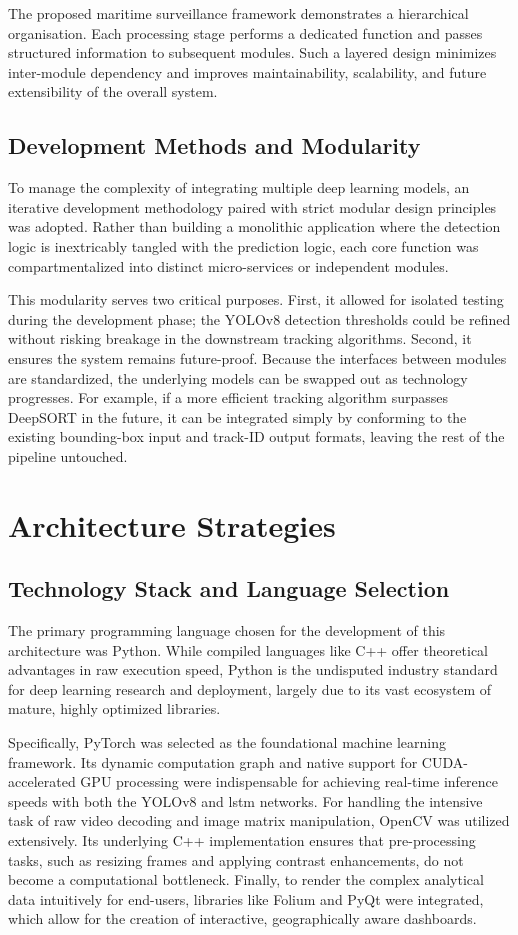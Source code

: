 The proposed maritime surveillance framework demonstrates a hierarchical organisation. Each processing stage performs a dedicated function and passes structured information to subsequent modules. Such a layered design minimizes inter-module dependency and improves maintainability, scalability, and future extensibility of the overall system.

\subsection{Development Methods and Modularity}
To manage the complexity of integrating multiple deep learning models, an iterative development methodology paired with strict modular design principles was adopted. Rather than building a monolithic application where the detection logic is inextricably tangled with the prediction logic, each core function was compartmentalized into distinct micro-services or independent modules.

This modularity serves two critical purposes. First, it allowed for isolated testing during the development phase; the YOLOv8 detection thresholds could be refined without risking breakage in the downstream tracking algorithms. Second, it ensures the system remains future-proof. Because the interfaces between modules are standardized, the underlying models can be swapped out as technology progresses. For example, if a more efficient tracking algorithm surpasses DeepSORT in the future, it can be integrated simply by conforming to the existing bounding-box input and track-ID output formats, leaving the rest of the pipeline untouched.

\section{Architecture Strategies}

\subsection{Technology Stack and Language Selection}
The primary programming language chosen for the development of this architecture was Python. While compiled languages like C++ offer theoretical advantages in raw execution speed, Python is the undisputed industry standard for deep learning research and deployment, largely due to its vast ecosystem of mature, highly optimized libraries. 

Specifically, PyTorch was selected as the foundational machine learning framework. Its dynamic computation graph and native support for CUDA-accelerated GPU processing were indispensable for achieving real-time inference speeds with both the YOLOv8 and \gls{lstm} networks. For handling the intensive task of raw video decoding and image matrix manipulation, OpenCV was utilized extensively. Its underlying C++ implementation ensures that pre-processing tasks, such as resizing frames and applying contrast enhancements, do not become a computational bottleneck. Finally, to render the complex analytical data intuitively for end-users, libraries like Folium and PyQt were integrated, which allow for the creation of interactive, geographically aware dashboards.

